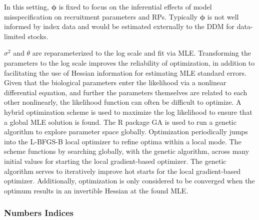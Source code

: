 %
In this setting, $\bm{\phi}$ is fixed %
to focus on the inferential effects of model misspecification on recruitment
parameters and RPs. Typically $\bm{\phi}$ is not well informed by index data and %
would be estimated externally to the DDM for data-limited stocks.
%

%
$\sigma^2$ and $\theta$ are reparameterized to the log scale and fit via MLE.
Transforming the parameters to the log scale improves the reliability of
optimization, in addition to facilitating the use of Hessian information for
estimating MLE standard errors. Given that the biological parameters enter the
likelihood via a nonlinear differential equation, and further the parameters
themselves are related to each other nonlinearly, the likelihood function can
often be difficult to optimize. A hybrid optimization scheme is used to
maximize the log likelihood to ensure that a global MLE solution is found. The
R package GA \cite{scrucca_ga_2013, scrucca_extensions_2017} is used to
run a genetic algorithm to explore parameter space globally. Optimization
periodically jumps into the L-BFGS-B local optimizer to refine optima within a
local mode. The scheme functions by searching globally, with the genetic
algorithm, across many initial values for starting the local gradient-based
optimizer. The genetic algorithm serves to iteratively improve hot starts for
the local gradient-based optimizer. Additionally, optimization is only
considered to be converged when the optimum results in an invertible Hessian at
the found MLE.

%
\subsubsection{Numbers Indices}

